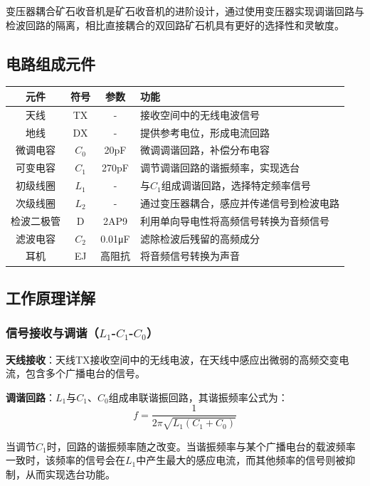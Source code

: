 \documentclass[12pt,UTF8]{ctexbook}
\begin{document}
变压器耦合矿石收音机是矿石收音机的进阶设计，通过使用变压器实现调谐回路与检波回路的隔离，相比直接耦合的双回路矿石机具有更好的选择性和灵敏度。

\subsection{电路组成元件}

\begin{center}
\begin{tabular}{|c|c|c|l|}
\hline
元件 & 符号 & 参数 & 功能 \\
\hline
天线 & TX & - & 接收空间中的无线电波信号 \\
地线 & DX & - & 提供参考电位，形成电流回路 \\
微调电容 & $C_0$ & 20pF & 微调调谐回路，补偿分布电容 \\
可变电容 & $C_1$ & 270pF & 调节调谐回路的谐振频率，实现选台 \\
初级线圈 & $L_1$ & - & 与$C_1$组成调谐回路，选择特定频率信号 \\
次级线圈 & $L_2$ & - & 通过变压器耦合，感应并传递信号到检波电路 \\
检波二极管 & D & 2AP9 & 利用单向导电性将高频信号转换为音频信号 \\
滤波电容 & $C_2$ & 0.01μF & 滤除检波后残留的高频成分 \\
耳机 & EJ & 高阻抗 & 将音频信号转换为声音 \\
\hline
\end{tabular}
\end{center}

\subsection{工作原理详解}

\subsubsection{信号接收与调谐（$L_1$-$C_1$-$C_0$）}

\textbf{天线接收}：天线TX接收空间中的无线电波，在天线中感应出微弱的高频交变电流，包含多个广播电台的信号。

\textbf{调谐回路}：$L_1$与$C_1$、$C_0$组成串联谐振回路，其谐振频率公式为：
\[ f = \frac{1}{2\pi\sqrt{L_1(C_1+C_0)}} \]

当调节$C_1$时，回路的谐振频率随之改变。当谐振频率与某个广播电台的载波频率一致时，该频率的信号会在$L_1$中产生最大的感应电流，而其他频率的信号则被抑制，从而实现选台功能。
\end{document}
